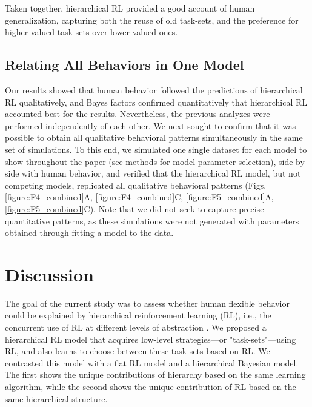 \documentclass[10pt,letterpaper]{article}  %
\newcommand{\rev}{\color{black}}
\begin{document}
Taken together, hierarchical RL provided a good account of human generalization, capturing both the reuse of old task-sets, and the preference for higher-valued task-sets over lower-valued ones.

\subsection*{Relating All Behaviors in One Model}
{\rev Our results showed that human behavior followed the predictions of hierarchical RL qualitatively, and Bayes factors confirmed quantitatively that hierarchical RL accounted best for the results.
Nevertheless, the previous analyzes were performed independently of each other. We next sought to confirm that it was possible to obtain all qualitative behavioral patterns simultaneously in the same set of simulations.
To this end, we simulated one single dataset for each model to show throughout the paper (see methods for model parameter selection), side-by-side with human behavior, and verified that the hierarchical RL model, but not competing models, replicated all qualitative behavioral patterns (Figs. \ref{figure:F4_combined}A, \ref{figure:F4_combined}C, \ref{figure:F5_combined}A, \ref{figure:F5_combined}C).
Note that we did not seek to capture precise quantitative patterns, as these simulations were not generated with parameters obtained through fitting a model to the data.}

\section*{Discussion}

The goal of the current study was to assess whether human flexible behavior could be explained by hierarchical reinforcement learning (RL), i.e., the concurrent use of RL at different levels of abstraction \cite{botvinick_hierarchically_2009, diuk_divide_2013}. 
We proposed a hierarchical RL model that acquires low-level strategies---or "task-sets"---using RL, and also learns to choose between these task-sets based on RL.
We contrasted this model with a flat RL model and a hierarchical Bayesian model. The first shows the unique contributions of hierarchy based on the same learning algorithm, while the second shows the unique contribution of RL based on the same hierarchical structure. 
\end{document}
